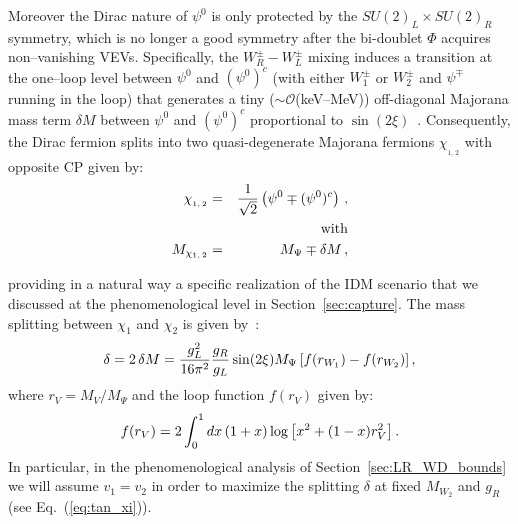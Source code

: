 \documentclass[11pt]{article}
\begin{document}
Moreover the Dirac nature of $\psi^0$ is only protected by the
$SU(2)_{L}\times SU(2)_{R}$ symmetry, which is no longer a good symmetry
after the bi-doublet $\Phi$ acquires non--vanishing VEVs.
Specifically, the $W^\pm_{R}-W^\pm_{L}$ mixing induces a transition at the one--loop level between $\psi^0$
and $(\psi^0)^c$ (with either $W^{\pm}_1$ or $W^{\pm}_{2}$
and $\psi^\mp$ running in the loop) that generates a tiny ($\sim\mathcal{O}$(keV--MeV)) off-diagonal Majorana mass term $\delta{M}$ between $\psi^0$ and $(\psi^0)^c$ proportional to $\sin(2\xi)$~\cite{Garcia-Cely_LR_pheno}. 
Consequently, the Dirac fermion splits into two quasi-degenerate Majorana fermions $\chi_{{}_{1,\,2}}$
with opposite CP given by: 
\begin{eqnarray}
\chi_{{}_{1,\,2}} &=& \dfrac{1}{\sqrt{2}}\left(\psi^0 \mp (\psi^0)^c\right)\,,\\
&&\hspace{-5cm}{\rm with} \nonumber  \\
M_{\chi_{1,\,2}} &=& M_{\Psi} \mp \delta{M}\, ,
\end{eqnarray}

\noindent providing in a natural way a specific realization of the IDM scenario that we discussed at the phenomenological level in Section~\ref{sec:capture}. The mass splitting between $\chi_1$ and $\chi_2$ is given by~\cite{Garcia-Cely_LR_pheno}:
\begin{equation}
\delta = 2 \hspace{0.6mm} \delta{M} = \frac{g_L^2}{16 \pi^2} \frac{g_R}{g_L} \sin(2\xi) M_{\Psi} 
\left[ f(r_{W_1}) - f(r_{W_2}) \right] ,
\label{eq:delta}
\end{equation}
where $r_V = M_V / M_{\Psi}$ and the loop function $f(r_V)$ given by: 
\begin{equation}
f(r_V) = 2 \int_0^1 dx \hspace{0.6mm} (1 + x) \log\left[ x^2 + (1-x) r^2_V \right] .
\label{eq:f_rV}
\end{equation}
In particular, in the phenomenological analysis of Section~\ref{sec:LR_WD_bounds} we will assume $v_1 = v_2$ in order to maximize the splitting $\delta$ at fixed $M_{W_2}$ and $g_R$ (see Eq.~(\ref{eq:tan_xi})).
\end{document}
